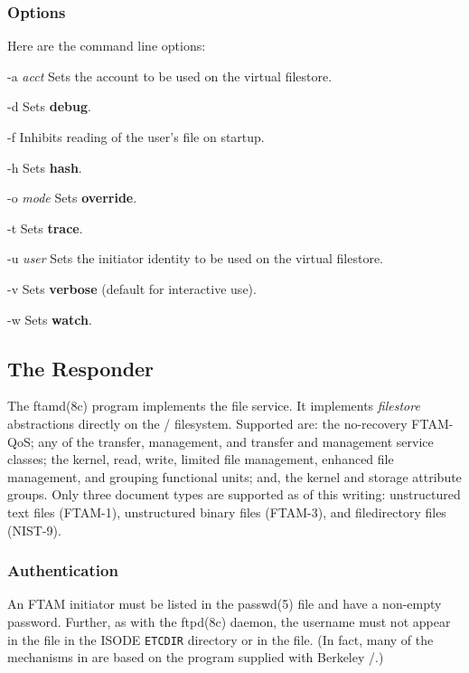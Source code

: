 \subsubsection	{Options}
Here are the command line options:
\begin{describe}
\item[-a {\em acct}]
Sets the account to be used on the virtual filestore.

\item[-d]
Sets {\bf debug}.

\item[-f]
Inhibits reading of the user's  file on startup.

\item[-h]
Sets {\bf hash}.

\item[-o  {\em mode}]
Sets {\bf override}.

\item[-t]
Sets {\bf trace}.

\item[-u  {\em user}]
Sets the initiator identity to be used on the virtual filestore.

\item[-v]
Sets {\bf verbose\/} (default for interactive use).

\item[-w]
Sets {\bf watch}.
\end{describe}

\subsection	{The Responder}
The \man ftamd(8c) program implements the file service.
It implements {\em filestore\/} abstractions directly on the \unix/ filesystem.
Supported are:
the no-recovery FTAM-QoS;
any of
the transfer, management, and transfer and management service classes;
the kernel, read, write, limited file management, enhanced file management, and
grouping functional units;
and, the kernel and storage attribute groups.
Only three document types are supported as of this writing:
unstructured text files (FTAM-1),
unstructured binary files (FTAM-3),
and filedirectory files (NIST-9).

\subsubsection	{Authentication}
An FTAM initiator must be listed in the \man passwd(5) file and have a
non-empty password.
Further, as with the \man ftpd(8c) daemon,
the username must not appear in the  file in the ISODE
\verb"ETCDIR" directory or in the  file.
(In fact, many of the mechanisms in  are based on the 
program supplied with Berkeley \unix/.)

